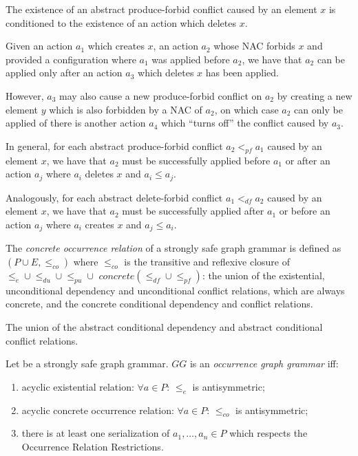 \begin{remark} The existence of an abstract produce-forbid conflict caused by an element $x$ is conditioned to the existence of an action which deletes $x$.

  Given an action $a_1$ which creates $x$, an action $a_2$ whose NAC forbids $x$ and provided a configuration where $a_1$ was applied before $a_2$, we have that $a_2$ can be applied only after an action $a_3$ which deletes $x$ has been applied.

  However, $a_3$ may also cause a new produce-forbid conflict on $a_2$ by creating a new element $y$ which is also forbidden by a NAC of $a_2$, on which case $a_2$ can only be applied of there is another action $a_4$ which ``turns off'' the conflict caused by $a_3$.

  In general, for each abstract produce-forbid conflict $a_2 <_{pf} a_1$ caused by an element $x$, we have that $a_2$ must be successfully applied before $a_1$ or after an action $a_{j}$ where $a_i$ deletes $x$ and $a_i \leq a_j$.

  Analogously, for each abstract delete-forbid conflict $a_1 <_{df} a_2$ caused by an element $x$, we have that $a_2$ must be successfully applied after $a_1$ or before an action $a_j$ where $a_i$ creates $x$ and $a_j \leq a_i$.
\end{remark}

\begin{definition} The \emph{concrete occurrence relation} of a strongly safe graph grammar is defined as $(P \cup E, \leq_{co})$ where $\leq_{co}$ is the transitive and reflexive closure of $\leq_{e} \cup \leq_{du} \cup \leq_{pu} \cup$  $concrete(\leq_{df} \cup \leq_{pf})$: the union of the existential, unconditional dependency and unconditional conflict relations, which are always concrete, and the concrete conditional dependency and conflict relations.
\end{definition}

\begin{definition} The union of the abstract conditional dependency and abstract conditional conflict relations.
\end{definition}

\begin{definition} Let \doublyTypedGraphGrammarCore{} be a strongly safe graph grammar. $GG$ is an \emph{occurrence graph grammar} iff:

  \begin{enumerate}
    \item acyclic existential relation: $\forall a \in P$: $\leq_e$ is antisymmetric;
    \item acyclic concrete occurrence relation: $\forall a \in P$: $\leq_{co}$ is antisymmetric;
    \item there is at least one serialization of $a_1,\ldots,a_n \in P$ which respects the Occurrence Relation Restrictions.
  \end{enumerate}
\end{definition}

\begin{definition}
\end{definition}

